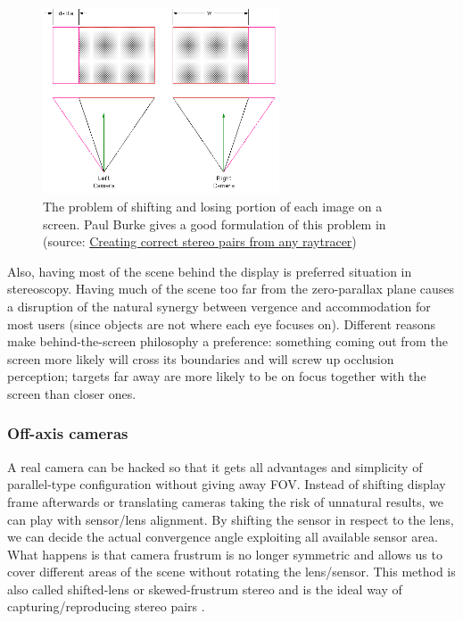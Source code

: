 \begin{figure}
\centering
\includegraphics[width=7cm]{schemas/parallel}
\caption{The problem of shifting and losing portion of each image on a screen. Paul Burke gives a good formulation of this problem in \cite{correct_stereo_pairs} (source: \href{http://klee.cittastudi.di.unimi.it/~dan/PGL/doc/articoli&libri/CalculatingStereoPairs.pdf} {Creating correct stereo pairs from any raytracer})}
\label{fig:parallel_cameras}
\end{figure}

Also, having most of the scene behind the display is preferred situation in stereoscopy. Having much of the scene too far from the zero-parallax plane causes a disruption of the natural synergy between vergence and accommodation for most users (since objects are not where each eye focuses on). Different reasons make behind-the-screen philosophy a preference: something coming out from the screen more likely will cross its boundaries and will screw up occlusion perception; targets far away are more likely to be on focus together with the screen than closer ones.

\subsubsection{Off-axis cameras}
A real camera can be hacked so that it gets all advantages and simplicity of parallel-type configuration without giving away FOV. Instead of shifting display frame afterwards or translating cameras taking the risk of unnatural results, we can play with sensor/lens alignment. By shifting the sensor in respect to the lens, we can decide the actual convergence angle exploiting all available sensor area. What happens is that camera frustrum is no longer symmetric and allows us to cover different areas of the scene without rotating the lens/sensor. This method is also called shifted-lens or skewed-frustrum stereo and is the ideal way of capturing/reproducing stereo pairs \cite{offaxis_frustrums}.

